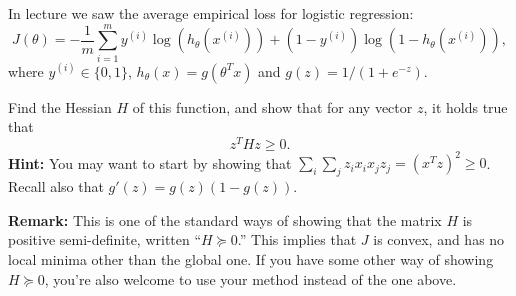 \item {}
In lecture we saw the average empirical loss for logistic regression:
\begin{equation*}
	J(\theta)
	= -\frac{1}{m} \sum_{i=1}^m y^{(i)}\log(h_{\theta}(x^{(i)}))
		+  (1 - y^{(i)})\log(1 - h_{\theta}(x^{(i)})),
\end{equation*}
where $y^{(i)} \in \{0, 1\}$, $h_\theta(x) = g(\theta^T x)$ and
$g(z) = 1 / (1 + e^{-z})$.

Find the Hessian $H$ of this function, and show that for any vector $z$, it
holds true that
%
\begin{equation*}
    z^T H z \ge 0.
\end{equation*}
%
{\bf Hint:} You may want to start by showing that
$\sum_i\sum_j z_i x_i x_j z_j = (x^Tz)^2 \geq 0$. Recall also that
$g'(z) = g(z)(1-g(z))$.

{\bf Remark:} This is one of the standard ways of showing that the matrix $H$
is positive semi-definite, written ``$H \succeq 0$.''  This implies that $J$ is
convex, and has no local minima other than the global one. If you have some
other way of showing $H \succeq 0$, you're also welcome to use your method
instead of the one above.

\ifnum{} {
  
} \fi

